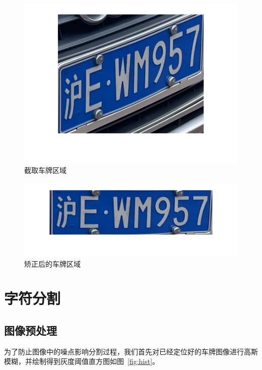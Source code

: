 \documentclass[utf8,a4paper]{ctexart}
\begin{document}
\begin{minipage}{0.44\linewidth}
    \begin{figure}[H]
        \center
        \includegraphics[width=\linewidth]{./img/difficult/定位.png}
        \caption{截取车牌区域}
        \label{fig:crop}
    \end{figure}
\end{minipage}
\hfill
\begin{minipage}{0.44\linewidth}
    \begin{figure}[H]
        \center
        \includegraphics[width=\linewidth]{./img/difficult/截取.png}
        \caption{矫正后的车牌区域}
        \label{fig:correct}
    \end{figure}
\end{minipage}
\par

\section{字符分割}
\subsection{图像预处理}
为了防止图像中的噪点影响分割过程，我们首先对已经定位好的车牌图像进行高斯模糊，并绘制得到灰度阈值直方图如图~\ref{fig:hist}。
\end{document}
